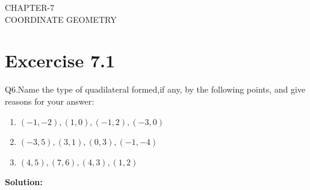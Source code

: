 \documentclass[12pt]{article}
\providecommand{\brak}[1]{\ensuremath{\left(#1\right)}}
\newcommand{\solution}{\noindent \textbf{Solution: }}
\begin{document}
\begin{center}
\textbf\large{CHAPTER-7 \\ COORDINATE GEOMETRY}

\end{center}
\section*{Excercise 7.1}

Q6.Name the type of quadilateral formed,if any, by the following points, and give reasons for your answer:
\begin{enumerate}
	\item $\brak{-1,-2}, \brak{1,0}, \brak{-1,2}, \brak{-3,0}$ 
	\item $\brak{-3,5}, \brak{3,1}, \brak{0,3}, \brak{-1,-4}$
	\item $\brak{4,5}, \brak{7,6}, \brak{4,3}, \brak{1,2}$
\end{enumerate}
\solution
\end{document}
